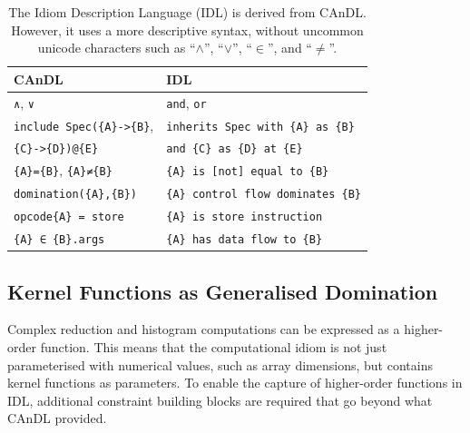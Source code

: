 \begin{table}[h]
    \lstset{keepspaces}
    \centering
    \begin{tabular}{|l|l|}
        \hline
        CAnDL & IDL\\
        \hline
        \hline
        {\lstinline[language=CAnDL]!∧!}, {\lstinline[language=CAnDL]!∨!} &
        {\lstinline[language=IDL]!and!}, {\lstinline[language=IDL]!or!} \\
        \hline
        {\lstinline[language=CAnDL]!include Spec({A}->{B}!}, &
        {\lstinline[language=IDL]!inherits Spec with {A} as {B}!}\\[-1mm]
        {\phantom{\lstinline[language=CAnDL]!include Spec(!}\lstinline[language=CAnDL]!{C}->{D})@{E}!} &
        {\phantom{\lstinline[language=IDL]!inherits Spec w!}\lstinline[language=IDL]!and {C} as {D} at {E}!}\\
        \hline
        {\lstinline[language=CAnDL]!{A}={B}!},
        {\lstinline[language=CAnDL]!{A}≠{B}!} &
        {\lstinline[language=IDL]!{A} is [not] equal to {B}!} \\
        \hline
        {\lstinline[language=CAnDL]!domination({A},{B})!} &
        {\lstinline[language=IDL]!{A} control flow dominates {B}!} \\
        \hline
        {\lstinline[language=CAnDL]!opcode{A} = store!} &
        {\lstinline[language=IDL]!{A} is store instruction!} \\
        \hline 
        {\lstinline[language=CAnDL]!{A} ∈ {B}.args!} &
        {\lstinline[language=IDL]!{A} has data flow to {B}!} \\
        \hline
    \end{tabular}
    \caption{The Idiom Description Language (IDL) is derived from CAnDL.
             However, it uses a more descriptive syntax, without uncommon
             unicode characters such as ``$\land$'', ``$\lor$'', ``$\in$'',
             and ``$\neq$''.\parfillskip=0pt}
    \label{CanDLtoIDL}
\end{table}

\subsection{Kernel Functions as Generalised Domination}

    Complex reduction and histogram computations can be expressed as a
    higher-order function.
    This means that the computational idiom is not just parameterised with
    numerical values, such as array dimensions, but contains kernel functions
    as parameters.
    To enable the capture of higher-order functions in IDL, additional
    constraint building blocks are required that go beyond what CAnDL
    provided.

